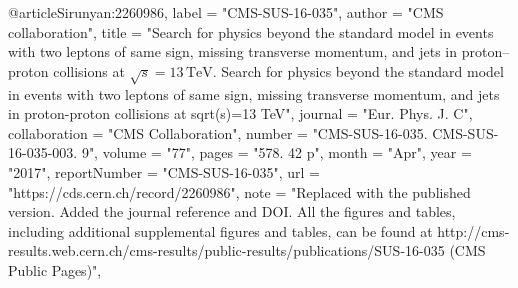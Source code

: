 @article{Sirunyan:2260986,
      label          = "CMS-SUS-16-035",
      author        = "{CMS collaboration}",
      title         = "{Search for physics beyond the standard model in events
                       with two leptons of same sign, missing transverse momentum,
                       and jets in proton--proton collisions at $\sqrt{s} =
                       13\,\text {TeV} $. Search for physics beyond the standard
                       model in events with two leptons of same sign, missing
                       transverse momentum, and jets in proton-proton collisions
                       at sqrt(s)=13 TeV}",
      journal       = "Eur. Phys. J. C",
      collaboration = "CMS Collaboration",
      number        = "CMS-SUS-16-035. CMS-SUS-16-035-003. 9",
      volume        = "77",
      pages         = "578. 42 p",
      month         = "Apr",
      year          = "2017",
      reportNumber  = "CMS-SUS-16-035",
      url           = "https://cds.cern.ch/record/2260986",
      note          = "Replaced with the published version. Added the journal
                       reference and DOI. All the figures and tables, including
                       additional supplemental figures and tables, can be found at
                       http://cms-results.web.cern.ch/cms-results/public-results/publications/SUS-16-035
                       (CMS Public Pages)",
}

